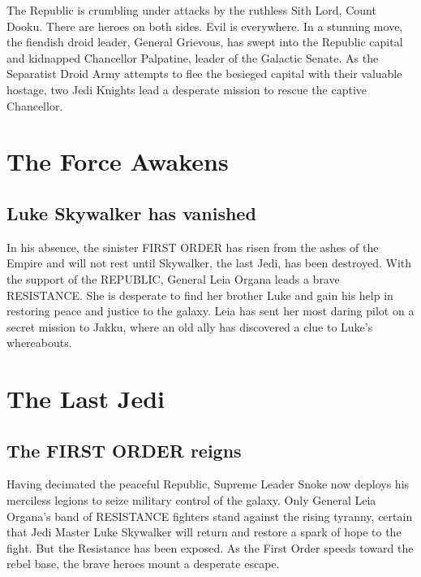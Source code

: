 \documentclass[oneside]{ifgw}
\begin{document}
The Republic is crumbling under attacks by the ruthless Sith Lord, Count Dooku. There are heroes on both sides. Evil is everywhere. In a stunning move, the fiendish droid leader, General Grievous, has swept into the Republic capital and kidnapped Chancellor Palpatine, leader of the Galactic Senate. As the Separatist Droid Army attempts to flee the besieged capital with their valuable hostage, two Jedi Knights lead a desperate mission to rescue the captive Chancellor.

\lipsum[1-10]

\chapter{The Force Awakens}

\section{Luke Skywalker has vanished}

In his absence, the sinister FIRST ORDER has risen from the ashes of the Empire and will not rest until Skywalker, the last Jedi, has been destroyed. With the support of the REPUBLIC, General Leia Organa leads a brave RESISTANCE. She is desperate to find her brother Luke and gain his help in restoring peace and justice to the galaxy. Leia has sent her most daring pilot on a secret mission to Jakku, where an old ally has discovered a clue to Luke's whereabouts.

\lipsum[1-10]


\chapter{The Last Jedi}
\section{The FIRST ORDER reigns}

Having decimated the peaceful Republic, Supreme Leader Snoke now deploys his merciless legions to seize military control of the galaxy. Only General Leia Organa's band of RESISTANCE fighters stand against the rising tyranny, certain that Jedi Master Luke Skywalker will return and restore a spark of hope to the fight. But the Resistance has been exposed. As the First Order speeds toward the rebel base, the brave heroes mount a desperate escape.
\end{document}
